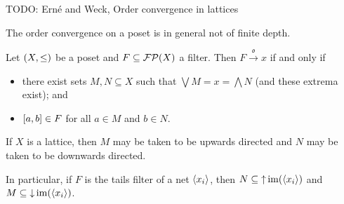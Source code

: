 TODO: Erné and Weck, Order convergence in lattices

\begin{example}
The order convergence on a poset is in general not of finite depth.
\end{example}


\begin{proposition} \label{orderConvergenceIntervalBase}
Let $\sSet{X,\leq}$ be a poset and $F\subseteq \operatorname{\mathcal{FP}}(X)$ a filter. Then $F\overset{\mathfrak{o}}{\longrightarrow} x$ \textup{if and only if}
\begin{itemize}
\item there exist sets $M,N\subseteq X$ such that $\bigvee M = x = \bigwedge N$ (and these extrema exist); and
\item $\interval{a,b}\in F$ for all $a\in M$ and $b\in N$.
\end{itemize}
If $X$ is a lattice, then $M$ may be taken to be upwards directed and $N$ may be taken to be downwards directed.
\end{proposition}
In particular, if $F$ is the tails filter of a net $\left\langle x_i \right\rangle$, then $N\subseteq \operatorname{\uparrow}\operatorname{im}(\left\langle x_i \right\rangle)$ and $M\subseteq \operatorname{\downarrow}\operatorname{im}(\left\langle x_i \right\rangle)$.
